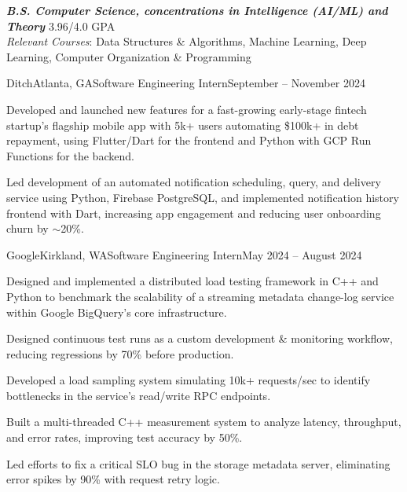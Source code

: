 \documentclass{article}
\begin{document}
\thispagestyle{empty}


\begin{flushleft}


{\textbf{\textit{B.S. Computer Science, concentrations in Intelligence (AI/ML) and Theory}} \hfill 3.96/4.0 GPA \\ \textit{Relevant Courses}:
    Data Structures \& Algorithms,
    Machine Learning,
    Deep Learning,
    Computer Organization \& Programming
    \\
}


    \begin{experience}{Ditch}{Atlanta, GA}{Software Engineering Intern}{September -- November 2024}
        \item Developed and launched new features for a fast-growing early-stage fintech startup's flagship mobile app with 5k+ users automating \$100k+ in debt repayment, using Flutter/Dart for the frontend and Python with GCP Run Functions for the backend.
        \item Led development of an automated notification scheduling, query, and delivery service using Python, Firebase PostgreSQL, and implemented notification history frontend with Dart, increasing app engagement and reducing user onboarding churn by $\sim$20\%.
    \end{experience}

    \begin{experience}{Google}{Kirkland, WA}{Software Engineering Intern}{May 2024 -- August 2024}
        \item Designed and implemented a distributed load testing framework in C++ and Python to benchmark the scalability of a streaming metadata change-log service within Google BigQuery's core infrastructure.
        \item Designed continuous test runs as a custom development \& monitoring workflow, reducing regressions by 70\% before production.
        \item Developed a load sampling system simulating 10k+ requests/sec to identify bottlenecks in the service's read/write RPC endpoints.
        \item Built a multi-threaded C++ measurement system to analyze latency, throughput, and error rates, improving test accuracy by 50\%.
        \item Led efforts to fix a critical SLO bug in the storage metadata server, eliminating error spikes by 90\% with request retry logic.
    \end{experience}


\end{flushleft}
\end{document}
